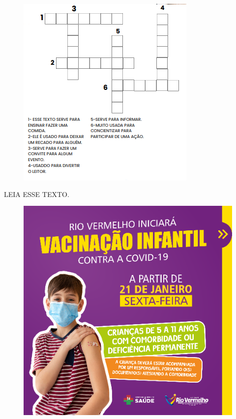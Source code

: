 \begin{figure}[htpb!]
\centering
\includegraphics[width=.7\textwidth]{media/image155.png}
\end{figure}


\pagebreak
LEIA ESSE TEXTO.

\begin{figure}[htpb!]
\centering
\includegraphics[width=\textwidth]{media/image156.png}
\end{figure}

